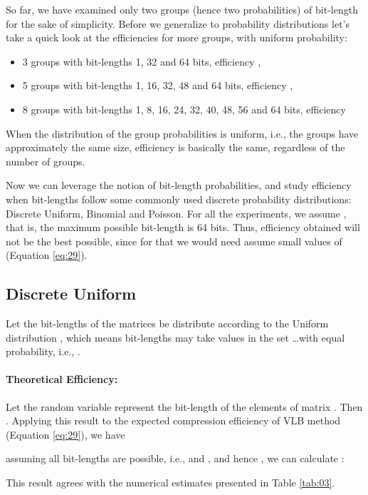 \documentclass[10pt]{article}
\begin{document}
So far, we have examined only two groups (hence two probabilities) of bit-length for the sake of simplicity. Before we generalize to probability distributions let's take a quick look at the efficiencies for more groups, with uniform probability:

\begin{itemize}
  \item 3 groups with bit-lengths 1, 32 and 64 bits, efficiency ,
  \item 5 groups with bit-lengths 1, 16, 32, 48 and 64 bits, efficiency ,
  \item 8 groups with bit-lengths 1, 8, 16, 24, 32, 40, 48, 56 and 64 bits, efficiency 
\end{itemize}

When the distribution of the group probabilities is uniform, i.e., the groups have approximately the same size, efficiency is basically the same, regardless of the number of groups.

Now we can leverage the notion of bit-length probabilities, and study efficiency when bit-lengths follow some  commonly used discrete probability distributions: Discrete Uniform, Binomial and Poisson. For all the experiments, we assume , that is, the maximum possible bit-length is 64 bits. Thus, efficiency obtained will not be the best possible, since for that we would need assume small values of  (Equation \ref{eq:29}). 

\subsection*{Discrete Uniform}
Let the bit-lengths of the matrices be distribute according to the Uniform distribution , which means bit-lengths may take values in the set \ldots with equal probability, i.e., . 

\paragraph{Theoretical Efficiency:}
Let the random variable  represent the  bit-length of the elements of matrix . Then .  Applying this result to the expected compression efficiency of VLB method (Equation \ref{eq:29}), we have 



assuming all bit-lengths are possible, i.e.,  and , and hence , we can calculate :



This result agrees with the numerical estimates presented in Table \ref{tab:03}.
\end{document}
